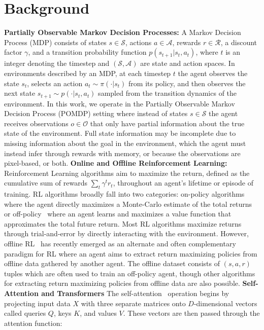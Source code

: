 \documentclass{article}
\theoremstyle{thm}
\newcommand{\state}{s}
\newcommand{\action}{a}
\begin{document}
\section{Background}
\label{sec:background}
{\bf Partially Observable Markov Decision Processes:} A Markov Decision Process (MDP) consists of states $\state \in \mathcal S$, actions $\action \in \mathcal A$, rewards $r \in \mathcal R$, a discount factor $\gamma$, and a transition probability function $p(s_{t+1}|s_t,a_t)$, where $t$ is an integer denoting the timestep and $(\mathcal S, \mathcal A)$ are state and action spaces. In environments described by an MDP, at each timestep $t$ the agent observes the state $s_t$, selects an action $a_t \sim \pi(\cdot | s_t)$ from its policy, and then observes the next state $s_{t+1} \sim p(\cdot|s_t, a_t)$ sampled from the transition dynamics of the environment. In this work, we operate in the Partially Observable Markov Decision Process (POMDP) setting where instead of states $s \in \mathcal S$ the agent receives observations $o \in \mathcal O$ that only have partial information about the true state of the environment.
Full state information may be incomplete due to missing information about the goal in the environment, which the agent must instead infer through rewards with memory, or because the observations are pixel-based, or both.
{\bf Online and Offline Reinforcement Learning:} Reinforcement Learning algorithms aim to maximize the return, defined as the cumulative sum of rewards $\sum_t \gamma^t r_t$, throughout an agent's lifetime or episode of training. RL algorithms broadly fall into two categories: on-policy algorithms~\citep{williams92reinforce} where the agent directly maximizes a Monte-Carlo estimate of the total returns or off-policy~\citep{mnih2013dqn, mnih2015human} where an agent learns and maximizes a value function that approximates the total future return. Most RL algorithms maximize returns through trial-and-error by directly interacting with the environment. However, offline RL~\citep{levine2020offline} has recently emerged as an alternate and often complementary paradigm for RL where an agent aims to extract return maximizing policies from offline data gathered by another agent. The offline dataset consists of $(s, a, r)$ tuples which are often used to train an off-policy agent, though other algorithms for extracting return maximizing policies from offline data are also possible.
{\bf Self-Attention and Transformers}
The self-attention~\citep{vaswani2017attention} operation begins by projecting input data $X$ with three separate matrices onto $D$-dimensional vectors called queries $Q$, keys $K$, and values $V$. These vectors are then passed through the attention function:
\end{document}
